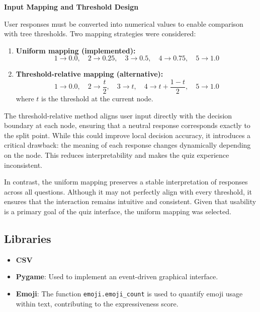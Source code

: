 \documentclass[11pt]{article}
\begin{document}
\medskip

\textbf{Input Mapping and Threshold Design}

User responses must be converted into numerical values to enable comparison with tree thresholds. Two mapping strategies were considered:

\begin{enumerate}
    \item \textbf{Uniform mapping (implemented):}
    \[
    1 \rightarrow 0.0,\quad 2 \rightarrow 0.25,\quad 3 \rightarrow 0.5,\quad 4 \rightarrow 0.75,\quad 5 \rightarrow 1.0
    \]

    \item \textbf{Threshold-relative mapping (alternative):}
    \[
    1 \rightarrow 0.0,\quad 2 \rightarrow \frac{t}{2},\quad 3 \rightarrow t,\quad 4 \rightarrow t + \frac{1 - t}{2},\quad 5 \rightarrow 1.0
    \]
    where $t$ is the threshold at the current node.
\end{enumerate}

The threshold-relative method aligns user input directly with the decision boundary at each node, ensuring that a neutral response corresponds exactly to the split point. While this could improve local decision accuracy, it introduces a critical drawback: the meaning of each response changes dynamically depending on the node. This reduces interpretability and makes the quiz experience inconsistent.

In contrast, the uniform mapping preserves a stable interpretation of responses across all questions. Although it may not perfectly align with every threshold, it ensures that the interaction remains intuitive and consistent. Given that usability is a primary goal of the quiz interface, the uniform mapping was selected.

\subsection{Libraries}

\begin{itemize}
    \item \textbf{CSV}
    \item \textbf{Pygame}: Used to implement an event-driven graphical interface. 
    \item \textbf{Emoji}: The function \texttt{emoji.emoji\_count} is used to quantify emoji usage within text, contributing to the expressiveness score.
\end{itemize}
\end{document}
